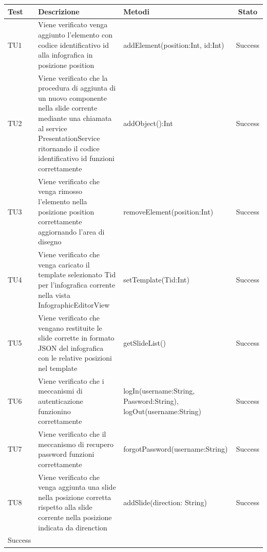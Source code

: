 \begin{table}[h]
	\begin{center}
	\begin{tabular}{|l|p{}|p{}|c|}
	\toprule
		\textbf{Test} & \textbf{Descrizione} & \textbf{Metodi} & \textbf{Stato}\\
	\midrule
		TU1 & Viene verificato venga aggiunto l'elemento con codice identificativo id alla infografica
in posizione position & addElement(position:Int, id:Int) & Success\\
	\midrule
		TU2 & Viene verificato che la procedura di aggiunta di un nuovo componente nella slide corrente mediante una chiamata al service PresentationService ritornando il codice identificativo id funzioni correttamente & addObject():Int & Success\\
	\midrule
		TU3 & Viene verificato che venga rimosso l'elemento nella posizione position correttamente aggiornando l'area di disegno & removeElement(position:Int) & Success\\
	\midrule
		TU4 & Viene verificato che venga caricato il template selezionato Tid per l'infografica corrente nella vista InfographicEditorView & setTemplate(Tid:Int) & Success\\
	\midrule
		TU5 & Viene verificato che vengano restituite le slide corrette in formato JSON del infografica con le relative posizioni nel template & getSlideList() & Success\\
	\midrule
		TU6 & Viene verificato che i meccanismi di autenticazione funzionino correttamente & logIn(username:String, Password:String), logOut(username:String) & Success\\
	\midrule
		TU7 & Viene verificato che il meccanismo di recupero password funzioni correttamente & forgotPassword(username:String) & Success\\
	\midrule
		TU8 & Viene verificato che venga aggiunta una slide nella posizione corretta rispetto alla slide corrente nella posizione indicata da direnction & addSlide(direction: String) & Success\\ Success\\
\end{tabular}
\end{center}	
\end{table}
